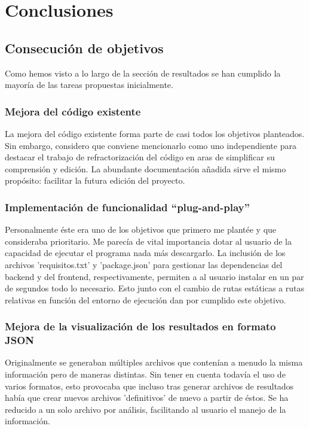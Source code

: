 \documentclass[a4paper, 12pt]{book}
\begin{document}
\cleardoublepage
\chapter{Conclusiones}
\label{chap:conclusiones}


\section{Consecución de objetivos}
\label{sec:consecucion-objetivos}

Como hemos visto a lo largo de la sección de resultados se han cumplido la mayoría de las tareas propuestas inicialmente. 

\subsection{Mejora del código existente}

La mejora del código existente forma parte de casi todos los objetivos planteados. Sin embargo, considero que conviene mencionarlo como uno independiente para destacar el trabajo de refractorización del código en aras de simplificar su comprensión y edición. La abundante documentación añadida sirve el mismo propósito: facilitar la futura edición del proyecto.

\subsection{Implementación de funcionalidad ``plug-and-play''}

Personalmente éste era uno de los objetivos que primero me plantée y que consideraba prioritario. Me parecía de vital importancia dotar al usuario de la capacidad de ejecutar el programa nada más descargarlo. La inclusión de los archivos 'requisitos.txt' y 'package.json' para gestionar las dependencias del backend y del frontend, respectivamente, permiten a al usuario instalar en un par de segundos todo lo necesario. Esto junto con el cambio de rutas estáticas a rutas relativas en función del entorno de ejecución dan por cumplido este objetivo.

\subsection{Mejora de la visualización de los resultados en formato JSON}

Originalmente se generaban múltiples archivos que contenían a menudo la misma información pero de maneras distintas. Sin tener en cuenta todavía el uso de varios formatos, esto provocaba que incluso tras generar archivos de resultados había que crear nuevos archivos 'definitivos' de nuevo a partir de éstos. Se ha reducido a un solo archivo por análisis, facilitando al usuario el manejo de la información.
\end{document}
